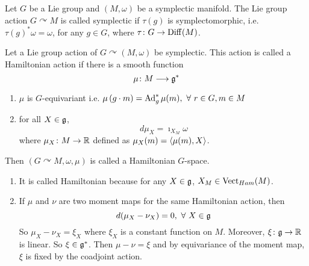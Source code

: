\documentclass[a4paper,12pt]{article}
\begin{document}
	Let $G$ be a Lie group and $(M,\omega)$ be a symplectic manifold. The Lie group action $G\curvearrowright M$ is called symplectic if $\tau(g)$ is symplectomorphic, i.e. $\tau(g)^*\omega = \omega$, for any $g \in G$, where $\tau\colon G \rightarrow \operatorname{Diff}(M)$.

	\begin{defn}
		Let a Lie group action of $G \curvearrowright (M,\omega)$ be symplectic. This action is called a Hamiltonian action if there is a smooth function
		\begin{equation*}
			\mu \colon M \longrightarrow \mathfrak{g}^*
		\end{equation*}
		\begin{enumerate}
			\item $\mu$ is $G$-equivariant i.e. $\mu\left(g \cdot m\right) = \operatorname{Ad}_g^*\mu(m),~\forall~r \in G,m\in M$
			\item for all $X \in \mathfrak{g}$,
			\begin{equation*}
				d\mu_X = \imath_{X_M}\omega
			\end{equation*}
			where $\mu_X  \colon M \rightarrow \mathbb{R}$ defined as $\mu_X(m) = \left\langle \mu(m),X \right\rangle$.
		\end{enumerate}
		Then $(G \curvearrowright M, \omega,\mu)$ is called a Hamiltonian $G$-space.
	\end{defn}
	\begin{rem}
		\begin{enumerate}
			\item It is called Hamiltonian because for any $X \in \mathfrak{g}$, $X_M \in \operatorname{Vect}_{Ham}(M)$.
			\item If  $\mu$ and $\nu$ are two moment maps for the same Hamiltonian action, then
			\begin{equation*}
				d(\mu_X-\nu_X) = 0,~\forall~X\in \mathfrak{g} 
			\end{equation*}
			So $\mu_X-\nu_X = \xi_X$ where $\xi_X$ is a constant function on $M$. Moreover, $\xi \colon \mathfrak{g} \rightarrow \mathbb{R}$ is linear. So $\xi \in \mathfrak{g}^*$. Then $\mu - \nu = \xi$ and by equivariance of the moment map,  $\xi$ is fixed by the coadjoint action.
		\end{enumerate}
	\end{rem}
\end{document}
